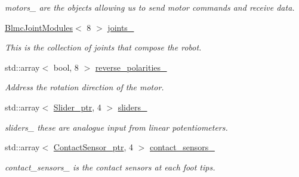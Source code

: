 \begin{DoxyCompactItemize}
\begin{DoxyCompactList}\small\item\em motors\+\_\+ are the objects allowing us to send motor commands and receive data. \end{DoxyCompactList}\item 
\hyperlink{classblmc__robots_1_1BlmcJointModules}{Blmc\+Joint\+Modules}$<$ 8 $>$ \hyperlink{classblmc__robots_1_1Solo8TI_ab1b54a7f74cfda8bd537d0adfc21166c}{joints\+\_\+}\hypertarget{classblmc__robots_1_1Solo8TI_ab1b54a7f74cfda8bd537d0adfc21166c}{}\label{classblmc__robots_1_1Solo8TI_ab1b54a7f74cfda8bd537d0adfc21166c}

\begin{DoxyCompactList}\small\item\em This is the collection of joints that compose the robot. \end{DoxyCompactList}\item 
std\+::array$<$ bool, 8 $>$ \hyperlink{classblmc__robots_1_1Solo8TI_ab706eca1708afb98625a50c8347fd3d3}{reverse\+\_\+polarities\+\_\+}\hypertarget{classblmc__robots_1_1Solo8TI_ab706eca1708afb98625a50c8347fd3d3}{}\label{classblmc__robots_1_1Solo8TI_ab706eca1708afb98625a50c8347fd3d3}

\begin{DoxyCompactList}\small\item\em Address the rotation direction of the motor. \end{DoxyCompactList}\item 
std\+::array$<$ \hyperlink{common__header_8hpp_a4cb9a95e8b2c0bf237ce29f5252c7b73}{Slider\+\_\+ptr}, 4 $>$ \hyperlink{classblmc__robots_1_1Solo8TI_ae4f93fdbb8c382e5b317e471f9c7c429}{sliders\+\_\+}\hypertarget{classblmc__robots_1_1Solo8TI_ae4f93fdbb8c382e5b317e471f9c7c429}{}\label{classblmc__robots_1_1Solo8TI_ae4f93fdbb8c382e5b317e471f9c7c429}

\begin{DoxyCompactList}\small\item\em sliders\+\_\+ these are analogue input from linear potentiometers. \end{DoxyCompactList}\item 
std\+::array$<$ \hyperlink{common__header_8hpp_ac78fe5c68e56a3b884117109959e4d58}{Contact\+Sensor\+\_\+ptr}, 4 $>$ \hyperlink{classblmc__robots_1_1Solo8TI_afc6e87d1cec24fd373345e41df874baf}{contact\+\_\+sensors\+\_\+}
\begin{DoxyCompactList}\small\item\em contact\+\_\+sensors\+\_\+ is the contact sensors at each foot tips. \end{DoxyCompactList}\end{DoxyCompactItemize}
